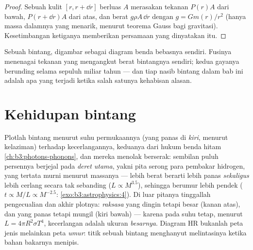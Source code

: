 \begin{proof}
Sebuah kulit $[r, r + \dd r]$ berluas $A$ merasakan tekanan $P(r)A$ dari
bawah, $P(r + \dd r)A$ dari atas, dan berat $g\rho A\,\dd r$
dengan $g = Gm(r)/r^2$ (hanya massa dalamnya yang menarik, menurut
teorema Gauss bagi gravitasi). Kesetimbangan ketiganya memberikan persamaan
yang dinyatakan itu.
\end{proof}

\begin{omfigure}

{\small Sebuah bintang, digambar sebagai diagram benda bebasnya sendiri. Fusinya
menenagai tekanan yang mengangkut berat bintangnya sendiri; kedua gayanya
berunding selama sepuluh miliar tahun --- dan tiap nasib bintang dalam
bab ini adalah apa yang terjadi ketika salah satunya kehabisan alasan.}
\end{omfigure}

\section{Kehidupan bintang}

\begin{definition}\label{def:b3:astrophysics:hr}
Plotlah bintang menurut suhu permukaannya (yang panas di \emph{kiri}, menurut
kelaziman) terhadap kecerlangannya, keduanya dari
hukum benda hitam \cref{ch:b3:photons-phonons}, dan mereka menolak
berserak: sembilan puluh persennya berjejal pada \emph{deret utama}, yakni
pita serong para pembakar hidrogen, yang tertata murni menurut massanya ---
lebih berat berarti lebih panas \emph{sekaligus} lebih cerlang secara tak
sebanding ($L \propto M^{3.5}$), sehingga berumur lebih pendek
($t \propto M/L \propto M^{-2.5}$:
\cref{exo:b3:astrophysics:4}). Di luar pitanya tinggallah
pengecualian dan akhir plotnya: \emph{raksasa} yang dingin tetapi besar
(kanan atas), dan \emph{} yang panas tetapi mungil (kiri bawah)
--- karena pada suhu tetap, menurut $L = 4\pi R^2\sigma T^4$,
kecerlangan adalah ukuran \emph{besarnya}. Diagram HR bukanlah
peta jenis melainkan peta \emph{umur}: titik sebuah bintang menghanyut
melintasinya ketika bahan bakarnya menipis.
\end{definition}

